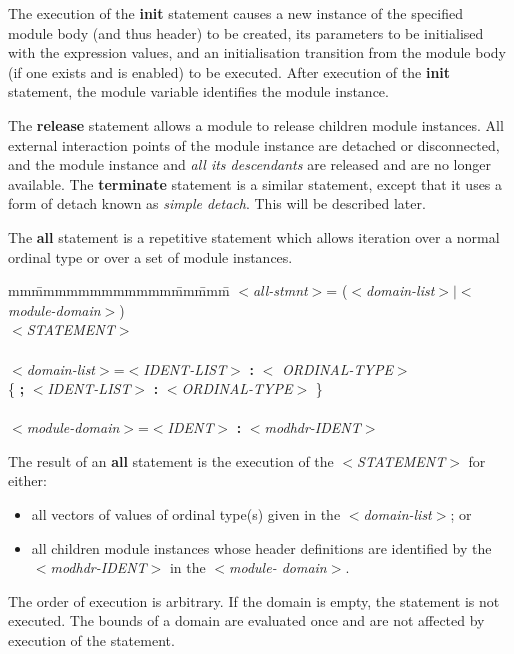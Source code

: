 The execution of the {\bf init} statement causes a new instance
of the specified module body (and thus header) to be
created, its parameters to be initialised with the
expression values, and an initialisation transition from the
module body (if one exists and is enabled) to be executed.
After execution of the {\bf init} statement, the module variable
identifies the module instance.
 
The {\bf release} statement allows a module to release children
module instances. All external interaction points of the
module instance are detached or disconnected, and the module
instance and {\em all its descendants} are released and are no
longer available. The {\bf terminate} statement is a similar
statement, except that it uses a form of detach known as
{\em simple detach}. This will be described later.
 
The {\bf all} statement is a repetitive statement which allows
iteration over a normal ordinal type or over a set of module
instances.

\begin{tabbing}
mm\=mmmmmmmmmmmm\=mm\=mmm\=\+\kill
$<${\em all-stmnt}$>$\>= ($<${\em domain-list}$>|<${\em
module-domain}$>$)\\
\>\> $<${\em STATEMENT}$>$\\
\mbox{}\\
$<${\em domain-list}$>$\>=\>$<${\em IDENT-LIST}$>$ {\bf :} $<${\em
ORDINAL-TYPE}$>$\\
\>\>\>\{ {\bf ;} $<${\em IDENT-LIST}$>$ {\bf :} $<${\em ORDINAL-TYPE}$>$
\}\\
\mbox{}\\
$<${\em module-domain}$>$\>=\>$<${\em IDENT}$>$ {\bf :} $<${\em modhdr-IDENT}$>$
\end{tabbing}

The result of an {\bf all} statement is the execution of the
$<${\em STATEMENT}$>$ for either:

\begin{itemize}
\item all vectors of values of ordinal type(s) given in the
 $<${\em domain-list}$>$; or

\item all children module instances whose header definitions are
 identified by the $<${\em modhdr-IDENT}$>$ in the $<${\em module-
 domain}$>$.
\end{itemize}

The order of execution is arbitrary. If the domain is
empty, the statement is not executed. The bounds of a
domain are evaluated once and are not affected by execution
of the statement.
 
